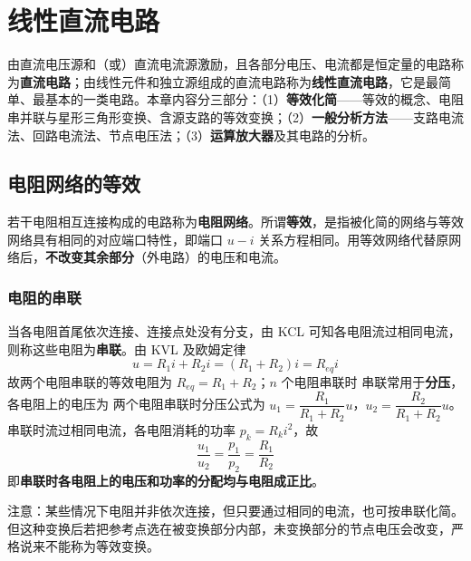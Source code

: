 \chapter{线性直流电路}

\noindent
由直流电压源和（或）直流电流源激励，且各部分电压、电流都是恒定量的电路称为\textbf{直流电路}；由线性元件和独立源组成的直流电路称为\textbf{线性直流电路}，它是最简单、最基本的一类电路。本章内容分三部分：（1）\textbf{等效化简}——等效的概念、电阻串并联与星形三角形变换、含源支路的等效变换；（2）\textbf{一般分析方法}——支路电流法、回路电流法、节点电压法；（3）\textbf{运算放大器}及其电路的分析。

\section{电阻网络的等效}
若干电阻相互连接构成的电路称为\textbf{电阻网络}。所谓\textbf{等效}，是指被化简的网络与等效网络具有相同的对应端口特性，即端口 $u-i$ 关系方程相同。用等效网络代替原网络后，\textbf{不改变其余部分}（外电路）的电压和电流。


\subsection{电阻的串联}
当各电阻首尾依次连接、连接点处没有分支，由 KCL 可知各电阻流过相同电流，则称这些电阻为\textbf{串联}。由 KVL 及欧姆定律
\begin{equation}
u=R_1i+R_2i=(R_1+R_2)i=R_{eq}i
\end{equation}
故两个电阻串联的等效电阻为 $R_{eq}=R_1+R_2$；$n$ 个电阻串联时
串联常用于\textbf{分压}，各电阻上的电压为
两个电阻串联时分压公式为 $u_1=\dfrac{R_1}{R_1+R_2}u$，$u_2=\dfrac{R_2}{R_1+R_2}u$。串联时流过相同电流，各电阻消耗的功率 $p_k=R_ki^2$，故
\begin{equation}
\frac{u_1}{u_2}=\frac{p_1}{p_2}=\frac{R_1}{R_2}
\end{equation}
即\textbf{串联时各电阻上的电压和功率的分配均与电阻成正比}。

注意：某些情况下电阻并非依次连接，但只要通过相同的电流，也可按串联化简。但这种变换后若把参考点选在被变换部分内部，未变换部分的节点电压会改变，严格说来不能称为等效变换。

